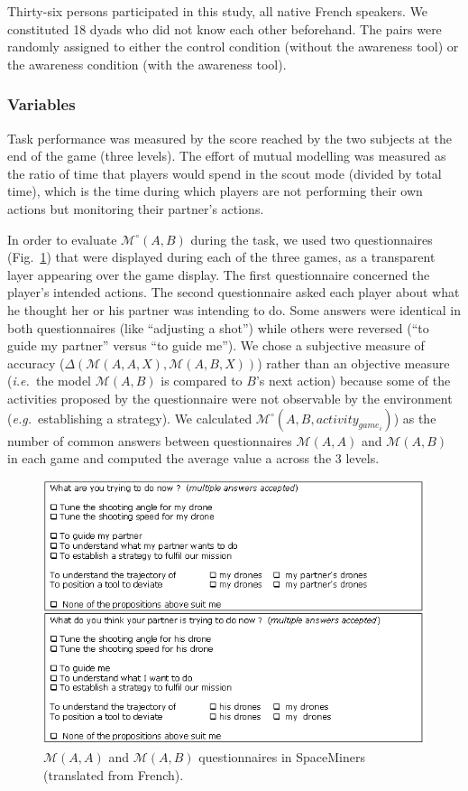 \documentclass[natbib]{svjour3}
\newcommand{\ie}{{\textit{i.e.\ }}}
\newcommand{\eg}{{\textit{e.g.\ }}}
\newcommand{\M}[3]{{\mathcal{M}(#1, #2, #3)}}
\newcommand{\gmodel}[2]{{$\mathcal{M}(#1, #2)$}}
\newcommand{\Model}[3]{{$\mathcal{M}^{\circ}(#1, #2, #3)$}}
\newcommand{\gModel}[2]{{$\mathcal{M}^{\circ}(#1, #2)$}}
\begin{document}
Thirty-six persons participated in this study, all native French speakers. We
constituted 18 dyads who did not know each other beforehand. The pairs were
randomly assigned to either the control condition (without the awareness tool)
or the awareness condition (with the awareness tool).

\subsubsection*{Variables}

Task performance was measured by the score reached by the two subjects at the
end of the game (three levels). The effort of mutual modelling was measured as
the ratio of time that players would spend in the scout mode (divided by total
time), which is the time during which players are not performing their own
actions but monitoring their partner's actions.

In order to evaluate \gModel{A}{B} during the task, we used two questionnaires
(Fig.~\ref{study1:questionnaires}) that were displayed during each of the three
games, as a transparent layer appearing over the game display. The first
questionnaire concerned the player's intended actions. The second questionnaire
asked each player about what he thought her or his partner was intending to do.
Some answers were identical in both questionnaires (like ``adjusting a shot'')
while others were reversed (``to guide my partner'' versus ``to guide me''). We
chose a subjective measure of accuracy ($\Delta(\M{A}{A}{X}, \M{A}{B}{X})$)
rather than an objective measure (\ie the model \gmodel{A}{B} is compared to $B$'s
next action) because some of the activities proposed by the questionnaire were not
observable by the environment (\eg establishing a strategy). We calculated
\Model{A}{B}{activity_{game_{i}}}) as the number of common answers between
questionnaires \gmodel{A}{A} and \gmodel{A}{B} in each game and computed the
average value a across the 3 levels.

\begin{figure}[ht!]
        \centering
        \includegraphics[width=0.7\columnwidth]{image5.png}
        \caption{\gmodel{A}{A} and \gmodel{A}{B} questionnaires in SpaceMiners
        (translated from French).}

        \label{study1:questionnaires}
\end{figure}
\end{document}
